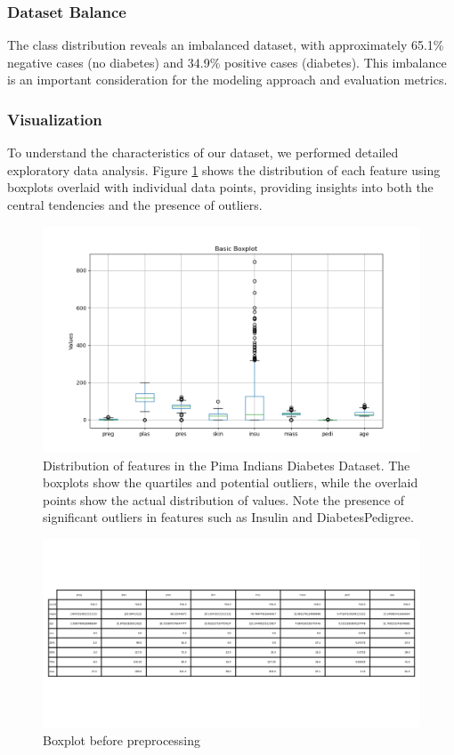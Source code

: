 \documentclass[a4paper,12pt]{article}
\begin{document}
\subsubsection{Dataset Balance}
The class distribution reveals an imbalanced dataset, with approximately 65.1\% negative cases (no diabetes) and 34.9\% positive cases (diabetes). This imbalance is an important consideration for the modeling approach and evaluation metrics.

\subsubsection{Visualization}
To understand the characteristics of our dataset, we performed detailed exploratory data analysis. Figure \ref{fig:distributions} shows the distribution of each feature using boxplots overlaid with individual data points, providing insights into both the central tendencies and the presence of outliers.

\begin{figure}[ht]
    \centering
    \includegraphics[width=1\textwidth]{images/boxplot.png}
    \caption{Distribution of features in the Pima Indians Diabetes Dataset. The boxplots show the quartiles and potential outliers, while the overlaid points show the actual distribution of values. Note the presence of significant outliers in features such as Insulin and DiabetesPedigree.}
    \label{fig:distributions}
\end{figure}
\newpage

\begin{figure}[ht]
    \centering
    \includegraphics[width=1\textwidth]{images/df_describe_table.png}
    \caption{Boxplot before preprocessing}
\end{figure}
\end{document}
